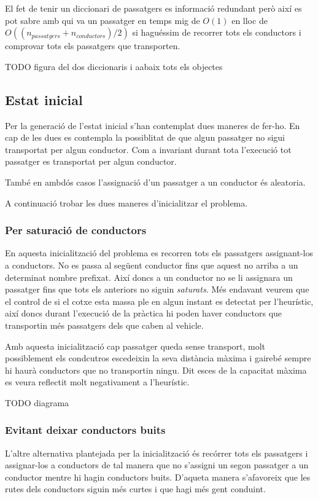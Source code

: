 El fet de tenir un diccionari de passatgers es informació redundant però així es pot sabre
amb qui va un passatger en temps mig de  $O(1)$ en lloc de $O((n_{passatgers} + n_{conductors})/2)$ 
si haguéssim de recorrer tots els conductors i comprovar tots els passatgers que transporten.

TODO figura del dos diccionaris i aabaix tots els objectes

\subsection{Estat inicial}
Per la generació de l'estat inicial s'han contemplat dues maneres de fer-ho. En cap de les dues es contempla
la possiblitat de que algun passatger no sigui transportat per algun conductor. Com a invariant durant
tota l'execució tot passatger es transportat per algun conductor.

També en ambdós casos l'assignació d'un passatger a un conductor és aleatoria.

A continuació trobar les dues maneres d'inicialitzar el problema.

\subsubsection{Per saturació de conductors}
En aquesta inicialització del problema es recorren tots els passatgers assignant-los a conductors. No es passa
al següent conductor fins que aquest no arriba a un determinat nombre prefixat. Així doncs a un conductor no se
li assignara un passatger fins que tots els anteriors no siguin \emph{saturats}. Més endavant veurem
que el control de si el cotxe esta massa ple en algun instant es detectat per l'heurístic, així doncs
durant l'execució de la pràctica hi poden haver conductors que transportin més passatgers dels que
caben al vehicle.

Amb aquesta inicialització cap passatger queda sense transport, molt possiblement els condcutros escedeixin
la seva distància màxima i gairebé sempre hi haurà conductors que no transportin ningu.
Dit esces de la capacitat màxima es veura reflectit molt negativament a l'heurístic.

TODO diagrama 

\subsubsection{Evitant deixar conductors buits}
L'altre alternativa plantejada per la inicialització és recórrer tots els passatgers i assignar-los a conductors
de tal manera que no s'assigni un segon passatger a un conductor mentre hi hagin conductors buits.
D'aqueta manera s'afavoreix que les rutes dels conductors siguin més curtes i que hagi més
gent conduint.

